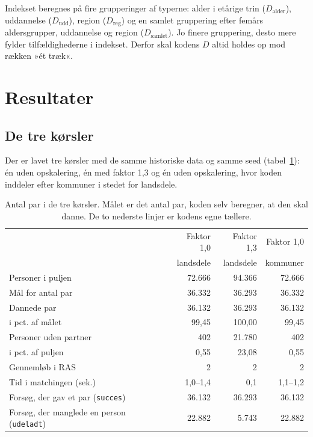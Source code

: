 \documentclass[11pt,a4paper]{article}
\newcommand{\kode}[1]{\texttt{#1}}
\begin{document}
Indekset beregnes på fire grupperinger af typerne: alder i etårige trin ($D_{\text{alder}}$),
uddannelse ($D_{\text{udd}}$), region ($D_{\text{reg}}$) og en samlet gruppering efter femårs
aldersgrupper, uddannelse og region ($D_{\text{samlet}}$). Jo finere gruppering, desto mere fylder
tilfældighederne i indekset. Derfor skal kodens $D$ altid holdes op mod rækken »ét træk«.


\section{Resultater}\label{sec:resultater}

\subsection{De tre kørsler}

Der er lavet tre kørsler med de samme historiske data og samme seed
(tabel~\ref{tab:koersler}): én uden opskalering, én med faktor 1,3 og én uden opskalering, hvor koden
inddeler efter kommuner i stedet for landsdele.

\begin{table}[ht]
\centering
\caption{Antal par i de tre kørsler. Målet er det antal par, koden selv beregner, at den skal danne.
De to nederste linjer er kodens egne tællere.}
\label{tab:koersler}
\begin{tabular}{@{}lrrr@{}}
\toprule
 & Faktor 1,0 & Faktor 1,3 & Faktor 1,0 \\
 & landsdele & landsdele & kommuner \\
\midrule
Personer i puljen & 72.666 & 94.366 & 72.666 \\
Mål for antal par & 36.332 & 36.293 & 36.332 \\
Dannede par & 36.132 & 36.293 & 36.132 \\
\quad i pct. af målet & 99,45 & 100,00 & 99,45 \\
Personer uden partner & 402 & 21.780 & 402 \\
\quad i pct. af puljen & 0,55 & 23,08 & 0,55 \\
Gennemløb i RAS & 2 & 2 & 2 \\
Tid i matchingen (sek.) & 1,0--1,4 & 0,1 & 1,1--1,2 \\
\midrule
Forsøg, der gav et par (\kode{succes}) & 36.132 & 36.293 & 36.132 \\
Forsøg, der manglede en person (\kode{udeladt}) & 22.882 & 5.743 & 22.882 \\
\bottomrule
\end{tabular}
\end{table}
\end{document}
